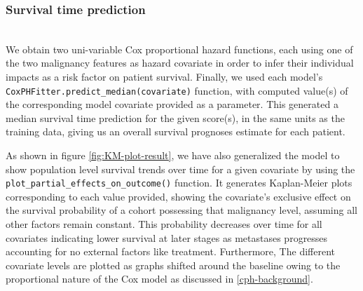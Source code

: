 \documentclass{l4proj}
\begin{document}
\subsubsection{Survival time prediction}\hfill \\
We obtain two uni-variable Cox proportional hazard functions, each using one of the two malignancy features as hazard covariate in order to infer their individual impacts as a risk factor on patient survival. Finally, we used each model's \texttt{CoxPHFitter.predict\_median(covariate)} function, with computed value(s) of the corresponding model covariate provided as a parameter. This generated a median survival time prediction for the given score(s), in the same units as the training data, giving us an overall survival prognoses estimate for each patient. 

As shown in figure \ref{fig:KM-plot-result}, we have also generalized the model to show population level survival trends over time for a given covariate by using the \texttt{plot\_partial\_effects\_on\_outcome()} function. It generates Kaplan-Meier plots corresponding to each value provided, showing the covariate's exclusive effect on the survival probability of a cohort possessing that malignancy level, assuming all other factors remain constant. This probability decreases over time for all covariates indicating lower survival at later stages as metastases progresses accounting for no external factors like treatment. Furthermore,  The different covariate levels are plotted as graphs shifted around the baseline owing to the proportional nature of the Cox model as discussed in \ref{cph-background}. 
\end{document}
